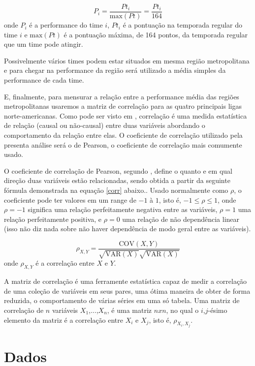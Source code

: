 \documentclass[12pt,oneside,a4paper,chapter=TITLE,english,brazil,sumario=abnt-6027-2012]{abntex2}
\begin{document}
	\begin{equation}
		P_i = \frac{Pt_i}{\mbox{max}(Pt)} = \frac{Pt_i}{164}
		\label{perf_nhl}
	\end{equation}
	onde $P_i$ é a performance do time $i$, $Pt_i$ é a pontuação na temporada regular do time $i$ e $\mbox{max}(Pt)$ é a pontuação máxima, de 164 pontos, da temporada regular que um time pode atingir.
	
	Possivelmente vários times podem estar situados em mesma região metropolitana e para chegar na performance da região será utilizado a média simples da performance de cada time.
	
	E, finalmente, para mensurar a relação entre a performance média das regiões metropolitanas usaremos a matriz de correlação para as quatro principais ligas norte-americanas. Como pode ser visto em , correlação é uma medida estatística de relação (causal ou não-causal) entre duas variáveis abordando o comportamento da relação entre elas. O coeficiente de correlação utilizado pela presenta análise será o de Pearson, o coeficiente de correlação mais comumente usado. 
	
	O coeficiente de correlação de Pearson, segundo , define o quanto e em qual direção duas variáveis estão relacionadas, sendo obtida a partir da seguinte fórmula demonstrada na equação \ref{corr} abaixo.. Usado normalmente como $\rho$, o coeficiente pode ter valores em um range de $-1$ à $1$, isto é, $-1 \leq \rho \leq 1$, onde $\rho =-1$ significa uma relação perfeitamente negativa entre as variáveis, $\rho=1$ uma relação perfeitamente positiva, e $\rho=0$ uma relação de não dependência linear (isso não diz nada sobre não haver dependência de modo geral entre as variáveis).
	
	\begin{equation}
		\rho_{X,Y} = \frac{\mbox{COV}(X,Y)}{\sqrt{\mbox{VAR}(X)}\sqrt{\mbox{VAR}(X)}}
		\label{corr}
	\end{equation}
	onde $\rho_{X,Y}$ é a correlação entre $X$ e $Y$.
	
	A matriz de correlação é uma ferramente estatística capaz de medir a correlação de uma coleção de variáveis em seus pares, uma ótima maneira de obter de forma reduzida, o comportamento de várias séries em uma só tabela. Uma matriz de correlação de $n$ variáveis $X_1$,...,$X_n$, é uma matriz $nxn$, no qual o $i$,$j$-ésimo elemento da matriz é a correlação entre $X_i$ e $X_j$, isto é, $\rho_{X_i,X_j}$.
	
	
\chapter{Dados}
\end{document}
